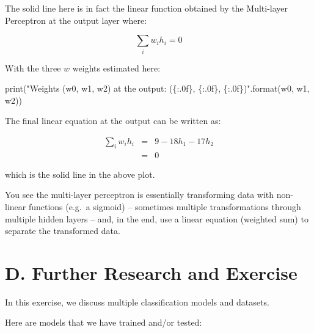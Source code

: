 \documentclass[
  letterpaper,
]{scrbook}
\newenvironment{Shaded}{\begin{snugshade}}{\end{snugshade}}
\newcommand{\BuiltInTok}[1]{\textcolor[rgb]{0.00,0.23,0.31}{#1}}
\newcommand{\NormalTok}[1]{\textcolor[rgb]{0.00,0.23,0.31}{#1}}
\newcommand{\SpecialCharTok}[1]{\textcolor[rgb]{0.37,0.37,0.37}{#1}}
\newcommand{\StringTok}[1]{\textcolor[rgb]{0.13,0.47,0.30}{#1}}
\begin{document}
The solid line here is in fact the linear function obtained by the
Multi-layer Perceptron at the output layer where:

\[ \sum_i w_i h_i = 0\]

With the three \(w\) weights estimated here:

\begin{Shaded}
\begin{Highlighting}[]
\BuiltInTok{print}\NormalTok{(}\StringTok{"Weights (w0, w1, w2) at the output: (}\SpecialCharTok{\{:.0f\}}\StringTok{, }\SpecialCharTok{\{:.0f\}}\StringTok{, }\SpecialCharTok{\{:.0f\}}\StringTok{)"}\NormalTok{.}\BuiltInTok{format}\NormalTok{(w0, w1, w2))}
\end{Highlighting}
\end{Shaded}

The final linear equation at the output can be written as:

\begin{eqnarray}
\sum_i w_i h_i & = & 9 - 18 h_1 - 17 h_2 \\
               & = & 0
\end{eqnarray}

which is the solid line in the above plot.

You see the multi-layer perceptron is essentially transforming data with
non-linear functions (e.g.~a sigmoid) -- sometimes multiple
transformations through multiple hidden layers -- and, in the end, use a
linear equation (weighted sum) to separate the transformed data.

\section*{D. Further Research and
Exercise}\label{d.-further-research-and-exercise}


In this exercise, we discuss multiple classification models and
datasets.

Here are models that we have trained and/or tested:
\end{document}
